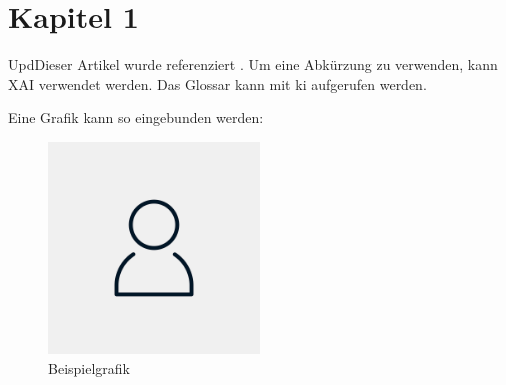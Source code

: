 \section{Kapitel 1}

UpdDieser Artikel wurde referenziert \cite{lowry_protein_1951}. Um eine Abkürzung zu verwenden, kann \ac{XAI} verwendet werden. Das Glossar kann mit \gls{ki} aufgerufen werden.

Eine Grafik kann so eingebunden werden:
\begin{figure}[H]
    \centering
    \includegraphics[width=0.5\textwidth]{assets/placehoder.png}
    \caption{Beispielgrafik}
    \label{fig:example}
\end{figure}

\lipsum[1-2]